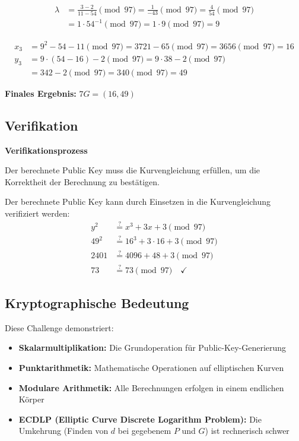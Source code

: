 \documentclass{article}
\begin{document}
\begin{align}
\lambda &= \frac{3 - 2}{11 - 54} \pmod{97} = \frac{1}{-43} \pmod{97} = \frac{4}{54} \pmod{97} \\
&= 1 \cdot 54^{-1} \pmod{97} = 1 \cdot 9 \pmod{97} = 9
\end{align}

\begin{align}
x_3 &= 9^2 - 54 - 11 \pmod{97} = 3721 - 65 \pmod{97} = 3656 \pmod{97} = 16 \\
y_3 &= 9 \cdot (54 - 16) - 2 \pmod{97} = 9 \cdot 38 - 2 \pmod{97} \\
&= 342 - 2 \pmod{97} = 340 \pmod{97} = 49
\end{align}

\begin{solutionbox}
\textbf{Finales Ergebnis:} $7G = (16, 49)$
\end{solutionbox}

\subsection{Verifikation}

\begin{infobox}
\textbf{Verifikationsprozess}

Der berechnete Public Key muss die Kurvengleichung erfüllen, um die Korrektheit der Berechnung zu bestätigen.
\end{infobox}

Der berechnete Public Key kann durch Einsetzen in die Kurvengleichung verifiziert werden:
\begin{align}
y^2 &\stackrel{?}{=} x^3 + 3x + 3 \pmod{97} \\
49^2 &\stackrel{?}{=} 16^3 + 3 \cdot 16 + 3 \pmod{97} \\
2401 &\stackrel{?}{=} 4096 + 48 + 3 \pmod{97} \\
73 &\stackrel{?}{=} 73 \pmod{97} \quad \checkmark
\end{align}

\subsection{Kryptographische Bedeutung}

\begin{tcolorbox}[colback=thd-blue!10,colframe=thd-blue,title=\textbf{Kryptographische Erkenntnisse}]
Diese Challenge demonstriert:
\begin{itemize}[leftmargin=1.5cm]
    \item \textbf{Skalarmultiplikation:} Die Grundoperation für Public-Key-Generierung
    \item \textbf{Punktarithmetik:} Mathematische Operationen auf elliptischen Kurven
    \item \textbf{Modulare Arithmetik:} Alle Berechnungen erfolgen in einem endlichen Körper
    \item \textbf{ECDLP (Elliptic Curve Discrete Logarithm Problem):} Die Umkehrung (Finden von $d$ bei gegebenem $P$ und $G$) ist rechnerisch schwer
\end{itemize}
\end{tcolorbox}
\end{document}
